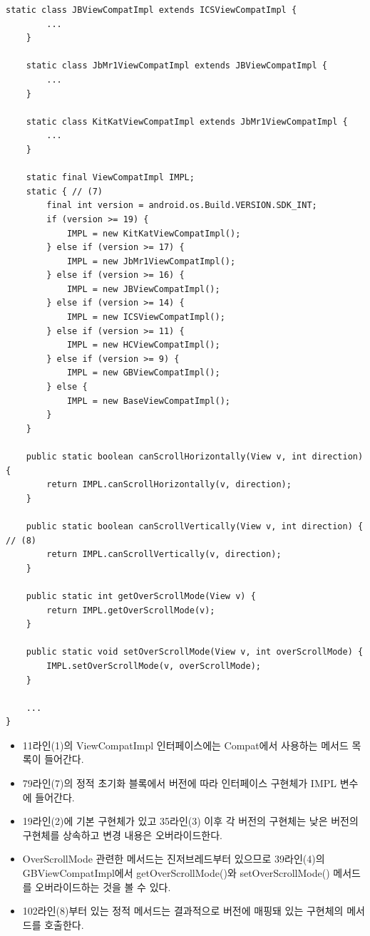 \begin{lstlisting}[frame=single]
    static class JBViewCompatImpl extends ICSViewCompatImpl {
        ...
    }

    static class JbMr1ViewCompatImpl extends JBViewCompatImpl {
    	...
    }

    static class KitKatViewCompatImpl extends JbMr1ViewCompatImpl {
        ...
    }

    static final ViewCompatImpl IMPL;
    static { // (7)
        final int version = android.os.Build.VERSION.SDK_INT;
        if (version >= 19) {
            IMPL = new KitKatViewCompatImpl();
        } else if (version >= 17) {
            IMPL = new JbMr1ViewCompatImpl();
        } else if (version >= 16) {
            IMPL = new JBViewCompatImpl();
        } else if (version >= 14) {
            IMPL = new ICSViewCompatImpl();
        } else if (version >= 11) {
            IMPL = new HCViewCompatImpl();
        } else if (version >= 9) {
            IMPL = new GBViewCompatImpl();
        } else {
            IMPL = new BaseViewCompatImpl();
        }
    }

    public static boolean canScrollHorizontally(View v, int direction) {
        return IMPL.canScrollHorizontally(v, direction);
    }

    public static boolean canScrollVertically(View v, int direction) { // (8)
        return IMPL.canScrollVertically(v, direction);
    }

    public static int getOverScrollMode(View v) {
        return IMPL.getOverScrollMode(v);
    }

    public static void setOverScrollMode(View v, int overScrollMode) {
        IMPL.setOverScrollMode(v, overScrollMode);
    }

 	...
}
\end{lstlisting}
\begin{itemize}
\item 11라인(1)의 ViewCompatImpl 인터페이스에는 Compat에서 사용하는 메서드 목록이 들어간다. 

\item 79라인(7)의 정적 초기화 블록에서 버전에 따라 인터페이스 구현체가 IMPL 변수에 들어간다.

\item 19라인(2)에 기본 구현체가 있고 35라인(3) 이후 각 버전의 구현체는 낮은 버전의 구현체를 상속하고 변경 내용은 오버라이드한다.

\item OverScrollMode 관련한 메서드는 진저브레드부터 있으므로 39라인(4)의 GBViewCompatImpl에서 getOverScrollMode()와 setOverScrollMode() 메서드를 오버라이드하는 것을 볼 수 있다.

\item 102라인(8)부터 있는 정적 메서드는 결과적으로 버전에 매핑돼 있는 구현체의 메서드를 호출한다.
\end{itemize}

